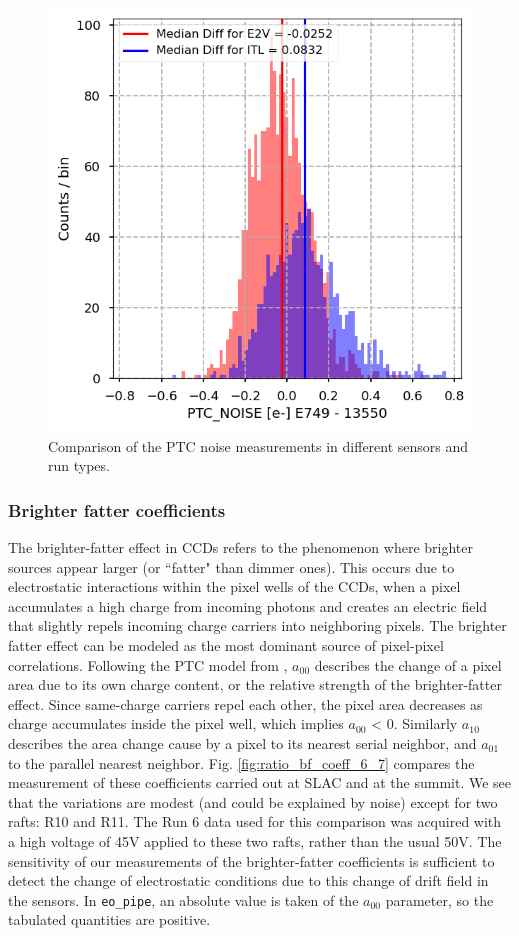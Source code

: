 \begin{figure}[ht]
    \centering
    \includegraphics[width=0.7\linewidth]{figures/baselineCharacterization/PTC_NOISE_13550_E749_diff.png}
    \caption{Comparison of the PTC noise measurements in different sensors and run types.}
    \label{fig:initRever:PTCNoise_hist_diff}
\end{figure}


\subsubsection{Brighter fatter coefficients}\label{brighter-fatter-a00-coefficient}


The brighter-fatter effect in CCDs refers to the phenomenon where brighter sources appear larger (or ``fatter" than dimmer ones). This occurs due to electrostatic interactions within the pixel wells of the CCDs, when a pixel accumulates a high charge from incoming photons and creates an electric field that slightly repels incoming charge carriers into neighboring pixels. The brighter fatter effect can be modeled as the most dominant source of pixel-pixel correlations. Following the PTC model from  
\citet{2019A&A...629A..36A}, $a_{00}$ describes the change of a pixel area due to its own charge content, or the relative strength of the brighter-fatter effect. Since same-charge carriers repel each other, the pixel area decreases as charge accumulates inside the pixel well, which implies $a_{00}$ \textless{} 0. Similarly $a_{10}$ describes the area change cause by a pixel to its nearest serial neighbor, and $a_{01}$ to the parallel nearest neighbor. Fig. \ref{fig:ratio_bf_coeff_6_7} compares the measurement of these coefficients carried out at SLAC and at the summit. We see that the variations are modest (and could be explained by noise) except for two rafts: R10 and R11. The Run 6 data used for this comparison was acquired with a high voltage of 45V applied to these two rafts, rather than the usual 50V. The sensitivity of our measurements of the brighter-fatter coefficients is sufficient to detect the change of electrostatic conditions due to this change of drift field in the sensors. In {\tt eo\_pipe}, an absolute value is taken of the $a_{00}$ parameter, so the tabulated quantities are positive.

